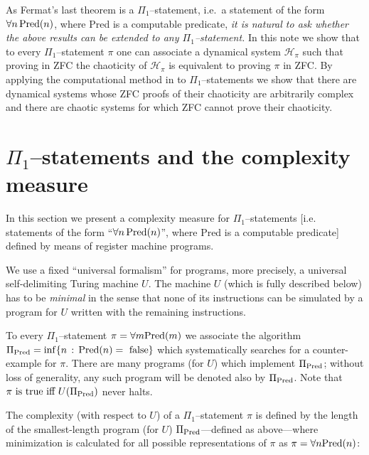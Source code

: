 \documentclass[
aip,
cha,
amssymb
]{revtex4-1}
\begin{document}
As Fermat's last theorem is a $\Pi_{1}$--statement, i.e.\ a statement of the form $\forall n \, {\rm Pred} (n)$, where Pred is a computable predicate, {\it  it is natural to ask whether
the above results can be extended to any $\Pi_{1}$--statement.}
In this note we show that to every $\Pi_{1}$--statement $\pi$ one can associate a dynamical system $\mathcal{H}_{\pi}$ such that
proving in ZFC the chaoticity of $\mathcal{H}_{\pi}$ is equivalent to proving  $\pi$ in ZFC.  By applying
the computational method  in  \cite{calude-elena-dinneen06,calude-elena-ec1,calude-elena-ec2}   to  $\Pi_{1}$--statements we
show that there are dynamical systems whose ZFC proofs of their chaoticity are arbitrarily complex and
there are chaotic systems for which ZFC cannot prove their chaoticity.

\section{$\Pi_{1}$--statements and the complexity measure}

In this section we present a complexity measure   \cite{calude-elena-dinneen06,calude-elena-ec1,calude-elena-ec2}
for  $\Pi_{1}$--statements [i.e. statements of the form ``$\forall n \, {\rm Pred}(n)$'',
where Pred is a computable predicate] defined by means of register machine programs.

We use a fixed ``universal formalism'' for programs, more precisely, a universal self-delimiting Turing machine $U$. The machine $U$ (which is fully described
below) has to be {\it minimal} in the sense
that none of its instructions can be simulated by a program for $U$ written with the remaining instructions.

To every $\Pi_{1}$--statement $\pi = \forall m {\rm Pred} (m)$ we associate the algorithm $\Pi_{\rm Pred}=\inf\{n\,:\, {\rm Pred}(n) = \mbox{ false}\}$ which systematically searches for a counter-example for $\pi$. There are many programs (for $U$) which implement $\Pi_{\rm Pred}$; without loss of generality, any such program will be denoted also by $\Pi_{\rm Pred}$. Note that
$ \pi \mbox{  is true iff   }  U(\Pi_{\rm Pred})$ never halts.

The complexity (with respect to $U$) of a $\Pi_{1}$--statement $\pi$ is defined by
the length of the smallest-length  program (for  $U$) $\Pi_{\rm Pred}$---defined as above---where minimization is calculated for all possible representations of $\pi$ as $\pi = \forall n {\rm Pred}(n)$:
\end{document}
